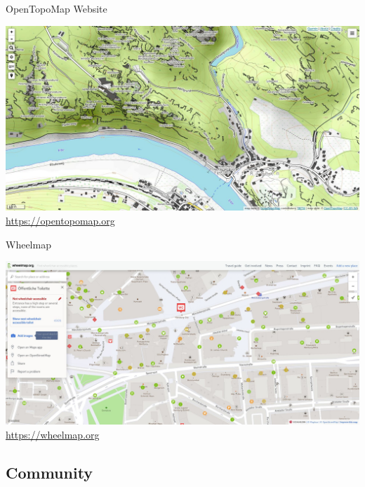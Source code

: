 \documentclass{beamer}
\begin{document}
			\begin{frame}{OpenTopoMap Website}
				\begin{center}
					\includegraphics[height=0.7\textheight]{images/opentopomap-website.jpg}\\
					\url{https://opentopomap.org}
				\end{center}
			\end{frame}
			
			\begin{frame}{Wheelmap}
				\begin{center}
					\includegraphics[height=0.7\textheight]{images/wheelmap-website.jpg}\\
					\url{https://wheelmap.org}
				\end{center}
			\end{frame}

		\subsection{Community}
		
\end{document}
